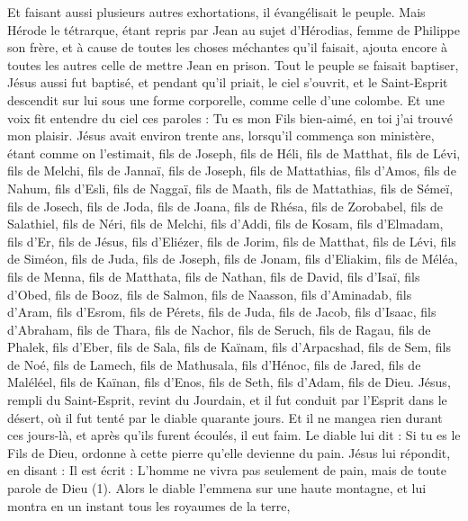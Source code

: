 \begin{multicols}{2}
Et faisant aussi plusieurs autres exhortations, il évangélisait le peuple.
Mais Hérode le tétrarque, étant repris par Jean au sujet d'Hérodias, femme de Philippe son frère, et à cause de toutes les choses méchantes qu’il faisait,
ajouta encore à toutes les autres celle de mettre Jean en prison.
Tout le peuple se faisait baptiser, Jésus aussi fut baptisé, et pendant qu’il priait, le ciel s'ouvrit,
et le Saint-Esprit descendit sur lui sous une forme corporelle, comme celle d'une colombe. Et une voix fit entendre du ciel ces paroles : Tu es mon Fils bien-aimé, en toi j’ai trouvé mon plaisir.
Jésus avait environ trente ans, lorsqu’il commença son ministère, étant comme on l’estimait, fils de Joseph, fils de Héli,
fils de Matthat, fils de Lévi, fils de Melchi, fils de Jannaï, fils de Joseph,
fils de Mattathias, fils d'Amos, fils de Nahum, fils d'Esli, fils de Naggaï,
fils de Maath, fils de Mattathias, fils de Sémeï, fils de Josech, fils de Joda,
fils de Joana, fils de Rhésa, fils de Zorobabel, fils de Salathiel, fils de Néri,
fils de Melchi, fils d'Addi, fils de Kosam, fils d'Elmadam, fils d'Er,
fils de Jésus, fils d'Eliézer, fils de Jorim, fils de Matthat, fils de Lévi,
fils de Siméon, fils de Juda, fils de Joseph, fils de Jonam, fils d'Eliakim,
fils de Méléa, fils de Menna, fils de Matthata, fils de Nathan, fils de David,
fils d’Isaï, fils d'Obed, fils de Booz, fils de Salmon, fils de Naasson,
fils d'Aminadab, fils d'Aram, fils d'Esrom, fils de Pérets, fils de Juda,
fils de Jacob, fils d'Isaac, fils d'Abraham, fils de Thara, fils de Nachor,
fils de Seruch, fils de Ragau, fils de Phalek, fils d'Eber, fils de Sala,
fils de Kaïnam, fils d’Arpacshad, fils de Sem, fils de Noé, fils de Lamech,
fils de Mathusala, fils d'Hénoc, fils de Jared, fils de Maléléel, fils de Kaïnan,
fils d'Enos, fils de Seth, fils d'Adam, fils de Dieu.
\VerseOne{}Jésus, rempli du Saint-Esprit, revint du Jourdain, et il fut conduit par l'Esprit dans le désert,
où il fut tenté par le diable quarante jours. Et il ne mangea rien durant ces jours-là, et après qu'ils furent écoulés, il eut faim.
Le diable lui dit : Si tu es le Fils de Dieu, ordonne à cette pierre qu'elle devienne du pain.
Jésus lui répondit, en disant : Il est écrit : L’homme ne vivra pas seulement de pain, mais de toute parole de Dieu (1).
Alors le diable l'emmena sur une haute montagne, et lui montra en un instant tous les royaumes de la terre,

\end{multicols}
